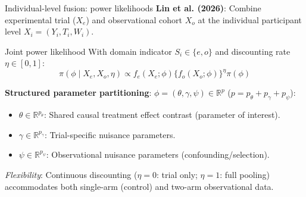 \documentclass[t]{beamer}
\newcommand{\R}{\mathbb{R}}
\begin{document}
\begin{frame}{Individual-level fusion: power likelihoods}
    \textbf{Lin et al. (2026)}: Combine experimental trial ($X_e$) and observational cohort $X_o$ at the individual participant level $X_i = (Y_i, T_i, W_i)$.

    \begin{block}{Joint power likelihood}
    With domain indicator $S_i \in \{e, o\}$ and discounting rate $\eta \in [0, 1]$:
    \begin{equation*}
        \pi(\phi \mid X_e, X_o, \eta) \propto f_e(X_e; \phi) \{ f_o(X_o; \phi) \}^\eta \pi(\phi)
    \end{equation*}
    \end{block}

    \textbf{Structured parameter partitioning}: $\phi = (\theta, \gamma, \psi) \in \R^p$ ($p = p_\theta + p_\gamma + p_\psi$):
    \begin{itemize}
        \item $\theta \in \R^{p_\theta}$: Shared causal treatment effect contrast (parameter of interest).
        \item $\gamma \in \R^{p_\gamma}$: Trial-specific nuisance parameters.
        \item $\psi \in \R^{p_\psi}$: Observational nuisance parameters (confounding/selection).
    \end{itemize}

    \emph{Flexibility}: Continuous discounting ($\eta = 0$: trial only; $\eta = 1$: full pooling) accommodates both single-arm (control) and two-arm observational data.
\end{frame}
\end{document}

